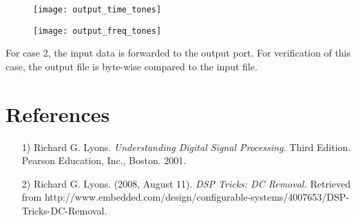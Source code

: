 \begin{figure}[ht]
	\centering
	\begin{minipage}{.5\textwidth}
		\centering\texttt{[image: output\_time\_tones]}
		\label{fig:out_time_tone}
	\end{minipage}%
	\begin{minipage}{.5\textwidth}
		\centering\texttt{[image: output\_freq\_tones]}
		\label{fig:out_freq_tone}
	\end{minipage}
\end{figure}
\noindent For case 2, the input data is forwarded to the output port. For verification of this case, the output file is byte-wise compared to the input file.

\newpage
\section*{References}
\begin{flushleft}
	\begin{itemize}
		\item[1)] Richard G. Lyons. \textit{Understanding Digital Signal Processing.} Third Edition. Pearson Education, Inc., Boston. 2001.
		\item[2)] Richard G. Lyons. (2008, August 11). \textit{DSP Tricks: DC Removal.} Retrieved from http://www.embedded.com/design/configurable-systems/4007653/DSP-Tricks-DC-Removal.
	\end{itemize}
\end{flushleft}

